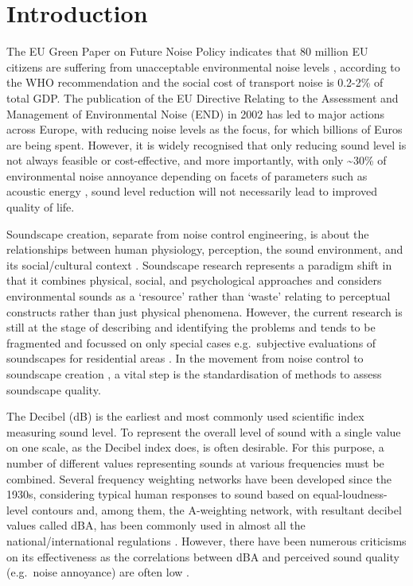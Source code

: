 \documentclass[
  authoryear,
  preprint,
  3p]{elsarticle}
\begin{document}
\section{Introduction}\label{introduction}

The EU Green Paper on Future Noise Policy indicates that 80 million EU
citizens are suffering from unacceptable environmental noise levels ,
according to the WHO recommendation \citep{Berglund1999Guidelines} and
the social cost of transport noise is 0.2-2\% of total GDP. The
publication of the EU Directive Relating to the Assessment and
Management of Environmental Noise (END)
\citep{EuropeanUnion2002Directive} in 2002 has led to major actions
across Europe, with reducing noise levels as the focus, for which
billions of Euros are being spent. However, it is widely recognised that
only reducing sound level is not always feasible or cost-effective, and
more importantly, with only \textasciitilde30\% of environmental noise
annoyance depending on facets of parameters such as acoustic energy
\citep{Guski1997Psychological}, sound level reduction will not
necessarily lead to improved quality of life.

Soundscape creation, separate from noise control engineering, is about
the relationships between human physiology, perception, the sound
environment, and its social/cultural context \citep{Kang2006Urban}.
Soundscape research represents a paradigm shift in that it combines
physical, social, and psychological approaches and considers
environmental sounds as a `resource' rather than `waste'
\citep{Kang2016Soundscape} relating to perceptual constructs rather than
just physical phenomena. However, the current research is still at the
stage of describing and identifying the problems and tends to be
fragmented and focussed on only special cases e.g.~subjective
evaluations of soundscapes for residential areas
\citep{SchulteFortkamp2013Introduction}. In the movement from noise
control to soundscape creation \citep{Aletta2015Soundscape}, a vital
step is the standardisation of methods to assess soundscape quality.

The Decibel (dB) is the earliest and most commonly used scientific index
measuring sound level. To represent the overall level of sound with a
single value on one scale, as the Decibel index does, is often
desirable. For this purpose, a number of different values representing
sounds at various frequencies must be combined. Several frequency
weighting networks have been developed since the 1930s, considering
typical human responses to sound based on equal-loudness-level contours
\citep{viii} and, among them, the A-weighting network, with resultant
decibel values called dBA, has been commonly used in almost all the
national/international regulations \citep{ix}. However, there have been
numerous criticisms on its effectiveness \citep{x} as the correlations
between dBA and perceived sound quality (e.g.~noise annoyance) are often
low \citep{xi}.
\end{document}
